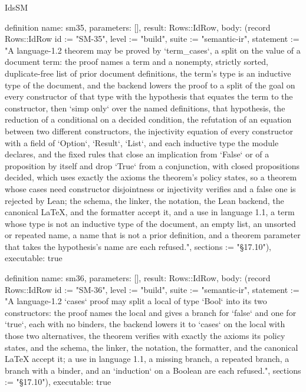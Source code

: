 \begin{lexlean}{IdsSM}
\begin{semanticmodule}
definition{
  name: sm35,
  parameters: [],
  result: Rows::IdRow,
  body: (record Rows::IdRow {id := "SM-35", level := "build", suite := "semantic-ir", statement := "A language-1.2 theorem may be proved by `term_cases`, a split on the value of a document term: the proof names a term and a nonempty, strictly sorted, duplicate-free list of prior document definitions, the term's type is an inductive type of the document, and the backend lowers the proof to a split of the goal on every constructor of that type with the hypothesis that equates the term to the constructor, then `simp only` over the named definitions, that hypothesis, the reduction of a conditional on a decided condition, the refutation of an equation between two different constructors, the injectivity equation of every constructor with a field of `Option`, `Result`, `List`, and each inductive type the module declares, and the fixed rules that close an implication from `False` or of a proposition by itself and drop `True` from a conjunction, with closed propositions decided, which uses exactly the axioms the theorem's policy states, so a theorem whose cases need constructor disjointness or injectivity verifies and a false one is rejected by Lean; the schema, the linker, the notation, the Lean backend, the canonical LaTeX, and the formatter accept it, and a use in language 1.1, a term whose type is not an inductive type of the document, an empty list, an unsorted or repeated name, a name that is not a prior definition, and a theorem parameter that takes the hypothesis's name are each refused.", sections := "§17.10"}),
  executable: true
}

definition{
  name: sm36,
  parameters: [],
  result: Rows::IdRow,
  body: (record Rows::IdRow {id := "SM-36", level := "build", suite := "semantic-ir", statement := "A language-1.2 `cases` proof may split a local of type `Bool` into its two constructors: the proof names the local and gives a branch for `false` and one for `true`, each with no binders, the backend lowers it to `cases` on the local with those two alternatives, the theorem verifies with exactly the axioms its policy states, and the schema, the linker, the notation, the formatter, and the canonical LaTeX accept it; a use in language 1.1, a missing branch, a repeated branch, a branch with a binder, and an `induction` on a Boolean are each refused.", sections := "§17.10"}),
  executable: true
}


\end{semanticmodule}
\end{lexlean}
